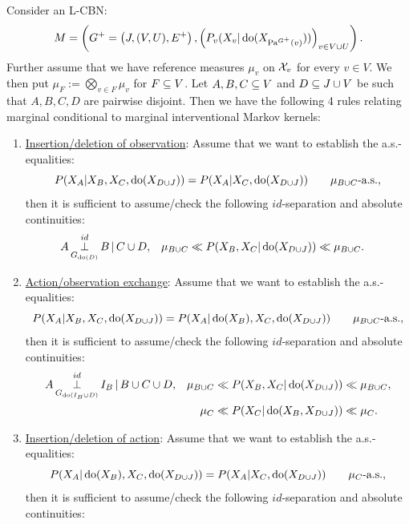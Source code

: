 \begin{Cor}
    \label{cor:as-do-calculus-4}
        Consider an L-CBN:
    \[M= \left ( G^+=\left ( J,(V,U),E^+ \right ), \left ( P_v ( X_v|\operatorname{do}( X_{\mathrm{Pa}^{G^+}(v)})) \right )_{v \in V \cup U} \right ).\]
    Further assume that we have %
    reference measures $\mu_v$ on $\mathcal{X}_v$ for every $v \in V$.
    We then put $\mu_F := \bigotimes_{v \in F} \mu_v$ for $F \subseteq V$.
    Let $A,B,C \subseteq V$ and $D \subseteq J \cup V$ be such that $A,B,C,D$ are pairwise disjoint.
    Then we have the following 4 rules relating marginal conditional to marginal interventional Markov kernels:
    \begin{enumerate}
        \item \underline{Insertion/deletion of observation}:
          Assume that we want to establish the a.s.-equalities:
          \[ P(X_A|X_B,X_C,\operatorname{do}(X_{D\cup J})) = P(X_A|X_C,\operatorname{do}(X_{D\cup J})) \qquad \mu_{B \cup C}\text{-a.s.}, \]
         then it is sufficient to assume/check the following $id$-separation and absolute continuities:
         \begin{align*} 
             A &\operatorname*{\perp}^{id}_{G_{\operatorname{do}(D)}} B \operatorname*{|} C \cup D, &
             \mu_{B \cup C} &\ll P(X_B,X_C|\operatorname{do}(X_{D \cup J}))\ll \mu_{B \cup C}.
         \end{align*}
     \item \underline{Action/observation exchange}: 
       Assume that we want to establish the a.s.-equalities:
        \[ P(X_A|X_B,X_C,\operatorname{do}(X_{D\cup J})) = P(X_A|\operatorname{do}(X_B),X_C,\operatorname{do}(X_{D\cup J})) \qquad \mu_{B \cup C}\text{-a.s.}, \]
         then it is sufficient to assume/check the following $id$-separation and absolute continuities:
         \begin{align*} 
             A & \operatorname*{\perp}^{id}_{G_{\operatorname{do}(I_B\cup D)}} I_B \operatorname*{|} B \cup C \cup D, &          
                    \mu_{B \cup C} &\ll  P(X_B,X_C|\operatorname{do}(X_{D\cup J})) \ll \mu_{B \cup C},\\
                 &&   \mu_C &\ll  P(X_C|\operatorname{do}(X_B,X_{D\cup J})) \ll \mu_C.
         \end{align*}
     \item \underline{Insertion/deletion of action}: 
         Assume that we want to establish the a.s.-equalities:
         \[ P(X_A|\operatorname{do}(X_B),X_C,\operatorname{do}(X_{D\cup J})) = P(X_A|X_C,\operatorname{do}(X_{D\cup J})) \qquad \mu_C\text{-a.s.}, \]
          then it is sufficient to assume/check the following $id$-separation and absolute continuities:
         \begin{align*} 

\end{align*}
\end{enumerate}
\end{Cor}
